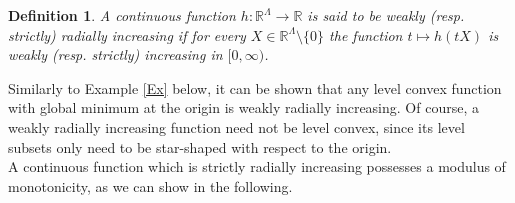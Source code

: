 \documentclass[a4paper,11pt]{article}
\numberwithin{equation}{section}
\newtheorem{Definition}[Theorem]{Definition}
\newcommand{\numberset}{\mathbb}
\newcommand{\R}{\numberset{R}}
\theoremstyle{definition}
\begin{document}
\begin{Definition}\label{def rad}
\indent
A continuous function $h:\R^\Lambda\longrightarrow \R$ is said to be weakly (resp. strictly) radially increasing if for every $X\in\R^\Lambda\setminus\{0\}$ the function $t\mapsto h(tX)$ is weakly (resp. strictly) increasing in $[0,\infty)$.
\end{Definition}
Similarly to Example \ref{Ex} below, it can be shown that any level convex function with global minimum at the origin is weakly radially increasing. Of course, a weakly radially increasing function need not be level convex, since its level subsets only need to be star-shaped with respect to the origin.
\\
A continuous function which is strictly radially increasing possesses a modulus of monotonicity, as we can show in the following.
\end{document}

